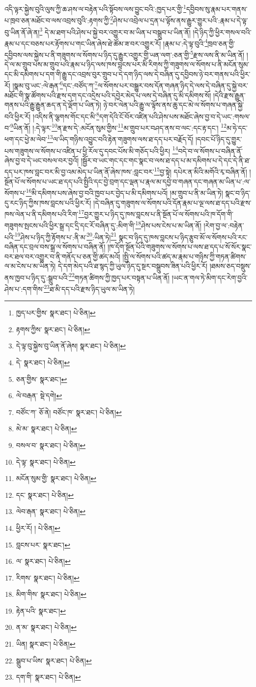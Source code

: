 འདི་ལྟར་སྐྱེས་བུའི་ལུས་ཀྱི་ཆ་ཤས་ལ་བརྟེན་པའི་སྟོབས་ལས་བྱུང་བའི་:ཁྱད་པར་གྱི་\footnote{ཁྱད་པར་གྱིས་  སྣར་ཐང་།  པེ་ཅིན། }དབྱིབས་སུ་རྣམ་པར་གནས་པ་ཁྲབ་ཅན་མཐོང་བ་ལས་འབྲས་བུའི་:རྟགས་ཀྱི་\footnote{རྟགས་ཀྱིས་  སྣར་ཐང་།  པེ་ཅིན། }ཤེས་པ་འབྲེལ་པ་དྲན་པ་ལྟོས་ནས་རྒྱུར་གྱུར་པའི་:རྣམ་པ་དེ་ལྟ་བུ་ཡིན་ནོ་ཞེ་ན།\footnote{དེ་ལྟ་བུ་སྐྱེས་བུ་ཡིན་ནོ་ཞེས།  སྣར་ཐང་།  པེ་ཅིན། } དེ་མ་ཐག་པའི་ཤེས་པ་སྐྱེ་བར་འགྱུར་བ་མ་ཡིན་པ་བསྒྲུབ་པ་ཡིན་ནོ། །དེ་ཉིད་ཀྱི་ཕྱིར་གསལ་བའི་རྣམ་པ་དང་བཅས་པར་རྟོགས་པ་གང་ཡིན་ཞེས་ཐེ་ཚོམ་ཟ་བར་འགྱུར་རོ། །རྣམ་པ་:དེ་ལྟ་བུའི་\footnote{དེ་  སྣར་ཐང་།  པེ་ཅིན། }ཁྲབ་ཅན་གྱི་དབྱིབས་ལས་སྐྱེས་པ་ནི་གཟུགས་ལ་སོགས་པ་ཉིད་དུ་རྒྱུར་འགྱུར་གྱི་ཡན་ལག་:ཅན་གྱི་\footnote{ཅན་གྱིས་  སྣར་ཐང་། }རྫས་ལས་ནི་མ་ཡིན་ནོ། །དེ་ལ་མ་གྲུབ་པས་མ་གྲུབ་པའི་རྣམ་པ་ཉིད་ལས་ཁས་བླངས་པར་མི་རིགས་ཀྱི་གཟུགས་ལ་སོགས་པ་ནི་མངོན་སུམ་དང་མི་དམིགས་པ་དག་གི་རྒྱུ་དང་འབྲས་བུར་གྲུབ་པ་དེ་དག་ཉིད་ལས་དེ་བཞིན་དུ་དབྱིབས་ཉེ་བར་གནས་པའི་ཕྱིར་རོ། །སྣམ་བུ་ཡང་:ལེ་རྒན་\footnote{ལེ་བརྒན་  སྡེ་དགེ། }དང་:བཙོད་ཀ་\footnote{བཙོང་ཀ་  ཅོ་ནེ། བཙོང་ཁ་  སྣར་ཐང་།  པེ་ཅིན། }ལ་སོགས་པར་བསྒྱུར་བས་དོན་གཞན་ཉིད་དེ་ལས་དེ་བཞིན་དུ་སྐྱེ་བར་མཐོང་གི་སྣ་ཚོགས་པའི་རྫས་དག་དང་འདྲེས་པའི་དབྱེར་མེད་པ་ལས་དེ་བཞིན་དུ་མི་དམིགས་སོ། །དེའི་རྫས་རྒྱུན་གནས་པའི་རྒྱུ་རྒྱུན་ཆད་ན་དེ་ལྡོག་པ་ཡིན་ཏེ། ཉེ་བར་ལེན་པའི་རྒྱུ་ལ་ལྟོས་ནས་ཆུ་དང་མེ་ལ་སོགས་པ་གཞན་སྐྱེ་བའི་ཕྱིར་རོ། །འདིས་ནི་ལྕགས་གོང་དང་མི་\footnote{མེ་མ་  སྣར་ཐང་།  པེ་ཅིན། }དག་དེའི་ངོ་བོར་འཛིན་པའི་ཤེས་པས་མཐོང་ཞེས་བྱ་བ་དེ་ཡང་:གསལ་བ་\footnote{བསལ་བ་  སྣར་ཐང་།  པེ་ཅིན། }ཡིན་ནོ། །:དེ་ལྟར་\footnote{དེ་ལྟ་  སྣར་ཐང་།  པེ་ཅིན། }ན་རྫས་དེ་:མངོན་སུམ་གྱིས་\footnote{མངོན་སུམ་གྱི་  སྣར་ཐང་།  པེ་ཅིན། }མ་གྲུབ་པར་བཤད་ནས་བ་ལང་:དང་རྟ་དང་། \footnote{དང་  སྣར་ཐང་།  པེ་ཅིན། }མ་ཧེ་དང་ཕག་དང་ཕྱེ་མ་ལེབ་\footnote{ལེབ་རྒན་  སྣར་ཐང་།  པེ་ཅིན། }ལ་ཡིད་གཉིས་འབྱུང་བའི་རྟེན་གཟུགས་ལས་ཐ་དད་པར་བརྗོད་དོ། །དབང་པོ་ཉིད་དུ་གྱུར་པས་གཟུགས་ལ་སོགས་པ་འཛིན་པ་ཕྱི་རོལ་དུ་དབང་པོས་མི་གཅོད་པའི་ཕྱིར། \footnote{ཕྱིར་རོ། །   པེ་ཅིན། }བདེ་བ་ལ་སོགས་པ་བཞིན་ནོ་ཞེས་བྱ་བ་དེ་ཡང་བསལ་བར་བྱའོ། །སྦྱོར་བ་ཡང་གང་དང་གང་སྣང་བ་ལས་ཐ་དད་པ་མ་དམིགས་པ་དེ་དང་དེ་ནི་ཐ་དད་པར་ཁས་བླང་བར་མི་བྱ་འམ་མེད་པ་ཡིན་ནོ་ཞེས་ཁས་:བླང་བར་\footnote{བླངས་པར་  སྣར་ཐང་། }བྱ་སྟེ། དཔེར་ན་མིའི་མགོའི་རྭ་བཞིན་ནོ། །སྔོན་པོ་ལ་སོགས་པ་ཡང་ཐ་དད་པའི་སྤྱིའི་དང་བྱེ་བྲག་དང་ལྡན་པ་རྣལ་མ་དབྱེ་བ་གཞན་དང་གཞན་མ་ཡིན་པ་:ལ་སོགས་པ་\footnote{ལ་  སྣར་ཐང་།  པེ་ཅིན། }མི་དམིགས་པས་ཞེས་བྱ་བའི་ཁྱབ་པར་བྱེད་པ་མི་དམིགས་པའོ། །མ་གྲུབ་པ་ནི་མ་ཡིན་ཏེ། སྣང་བ་ཉིད་དུ་རང་ཉིད་ཀྱིས་ཁས་བླངས་པའི་ཕྱིར་རོ། །དེ་བཞིན་དུ་གཟུགས་ལ་སོགས་པའི་དོན་རྣམ་པ་ལྔ་ལས་ཐ་དད་པའི་རྫས་ཁས་ལེན་པ་ནི་དམིགས་པའི་རིག་\footnote{རིགས་  སྣར་ཐང་།  པེ་ཅིན། }བྱར་གྱུར་པ་ཉིད་དུ་ཁས་བླངས་པ་ནི་སྔོན་པོ་ལ་སོགས་པའི་ཁ་དོག་གི་གཟུགས་སྤངས་པའི་ཕྱིར་སྒྲ་དང་དྲི་དང་རོ་བཞིན་དུ་:མིག་གི་\footnote{མིག་གིས་  སྣར་ཐང་།  པེ་ཅིན། }ཤེས་པས་ངེས་པ་མ་ཡིན་ནོ། །རེག་བྱ་ལ་:བརྟེན་པའི་\footnote{རྟེན་པའི་  སྣར་ཐང་། }ཤེས་པ་ཉིད་ཀྱི་རྟོགས་པ་:ནི་མ་\footnote{ན་མ་  སྣར་ཐང་།  པེ་ཅིན། }:ཡིན་ཏེ།\footnote{ཡིན།  སྣར་ཐང་།  པེ་ཅིན། } སྣང་བ་ཉིད་དུ་ཁས་བླངས་པ་ཉིད་རྩུབ་མོ་ལ་སོགས་པའི་རང་བཞིན་དང་བྲལ་བས་སྒྲ་ལ་སོགས་པ་བཞིན་ནོ། །ཁ་དོག་སྔོན་པོའི་གཟུགས་ལ་སོགས་པ་ལས་ཐ་དད་པ་སོ་སོར་སྣང་བར་ཐལ་བར་འགྱུར་བ་ནི་གནོད་པ་ཅན་གྱི་ཚད་མའོ། །སྤྱི་ལ་སོགས་པའི་ཚད་མ་རྣམ་པ་གཉིས་ཀྱི་གཏན་ཚིགས་ལ་མ་ངེས་པ་མ་ཡིན་ཏེ། དེ་དག་མེད་པའི་ཐ་སྙད་ཀྱི་ཡུལ་ཉིད་དུ་སྔར་བསྒྲུབས་ཟིན་པའི་ཕྱིར་རོ། །ཐམས་ཅད་བསྡུས་ནས་ཁྱབ་པ་ཉིད་དུ་:སྒྲུབ་པའི་\footnote{སྒྲུབ་པ་ཡིས་  སྣར་ཐང་།  པེ་ཅིན། }གཏན་ཚིགས་ཀྱི་ཁྱད་པར་བསྟན་པ་ཡིན་ནོ། །ཡང་ན་གལ་ཏེ་མིག་དང་རེག་བྱའི་ཤེས་པ་:དག་གིས་\footnote{དག་གི་  སྣར་ཐང་།  པེ་ཅིན། }ཐ་མི་དད་པའི་རྫས་ཉིད་ཡུལ་མ་ཡིན་ཏེ། 
